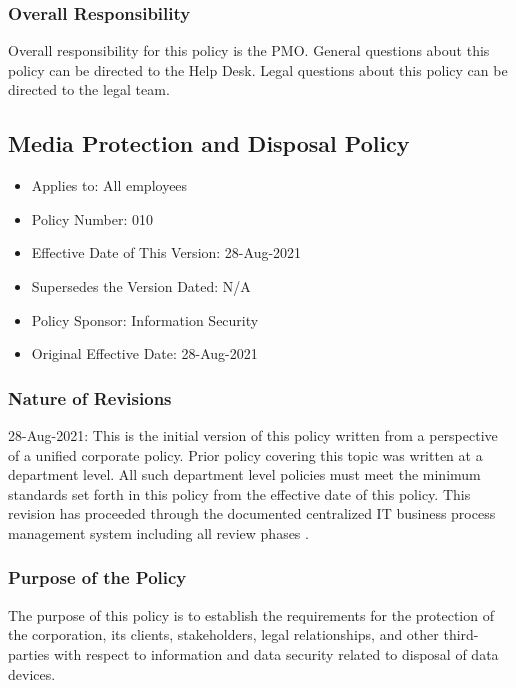 \documentclass[stu]{apa7}
\begin{document}
\subsubsection{Overall Responsibility}
\label{sec:org45b02fc}

Overall responsibility for this policy is the PMO. General questions about this policy can be directed to the Help Desk. Legal questions about this policy can be directed to the legal team.

\subsection{Media Protection and Disposal Policy}
\label{sec:org91b3a0c}

\begin{itemize}
\item Applies to: All employees
\item Policy Number: 010
\item Effective Date of This Version: 28-Aug-2021
\item Supersedes the Version Dated: N/A
\item Policy Sponsor: Information Security
\item Original Effective Date: 28-Aug-2021
\end{itemize}

\subsubsection{Nature of Revisions}
\label{sec:orge03d3eb}

28-Aug-2021: This is the initial version of this policy written from a perspective of a unified corporate policy. Prior policy covering this topic was written at a department level. All such department level policies must meet the minimum standards set forth in this policy from the effective date of this policy. This revision has proceeded through the documented centralized IT business process management system including all review phases \cite{wagleDevelopmentEffectiveCentralized2021}.

\subsubsection{Purpose of the Policy}
\label{sec:org0b1bdd7}

The purpose of this policy is to establish the requirements for the protection of the corporation, its clients, stakeholders, legal relationships, and other third-parties with respect to information and data security related to disposal of data devices.
\end{document}
